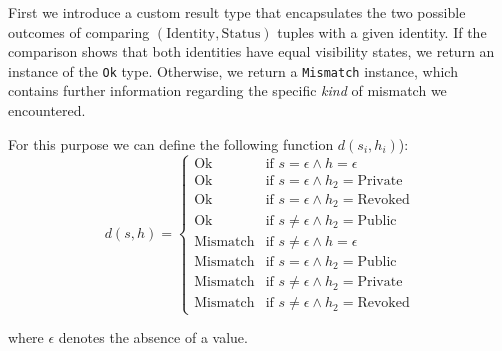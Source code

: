 First we introduce a custom result type that encapsulates the two possible outcomes of comparing $(\text{Identity},\text{Status})$ tuples with a given identity. If the comparison shows that both identities have equal visibility states, we return an instance of the \texttt{Ok} type. Otherwise, we return a \texttt{Mismatch} instance, which contains further information regarding the specific \emph{kind} of mismatch we encountered. 

 For this purpose we can define the following function \(d(s_i,h_i)\)): 
\[
    d(s,h) = \begin{cases}
        \text{Ok} & \text{if } s = \epsilon \wedge h = \epsilon \\
        \text{Ok} & \text{if } s = \epsilon \wedge h_2 = \text{Private} \\
        \text{Ok} & \text{if } s = \epsilon \wedge h_2 = \text{Revoked} \\
        \text{Ok} & \text{if } s \neq \epsilon \wedge h_2 = \text{Public} \\

        \text{Mismatch} & \text{if } s \neq \epsilon \wedge h = \epsilon \\
        \text{Mismatch} & \text{if } s = \epsilon \wedge h_2 = \text{Public} \\
        \text{Mismatch} & \text{if } s \neq \epsilon \wedge h_2 = \text{Private} \\
        \text{Mismatch} & \text{if } s \neq \epsilon \wedge h_2 = \text{Revoked} 
    \end{cases}    
\]

where \(\epsilon\) denotes the absence of a value.


